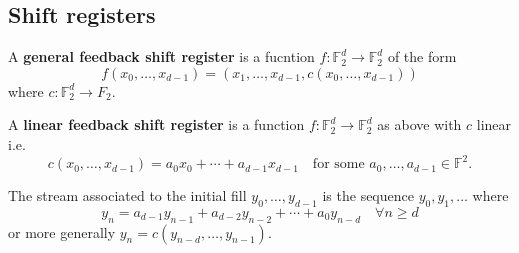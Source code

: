 \documentclass{article}
\newcommand{\F}{\mathbb{F}}
\newcommand{\1}[1]{\mathbbm{1}_{#1}}
\begin{document}
\subsection{Shift registers}
\begin{defi}
    A \textbf{general feedback shift register} is a fucntion $f:\F_2^d \to \F_2^d$ of the form
    \begin{equation*}
        f(x_0, \dotsc, x_{d-1}) = (x_1, \dotsc, x_{d-1}, c(x_0, \dotsc, x_{d-1}))
    \end{equation*}
    where $c:\F_2^d \to F_2$.
\end{defi}
\begin{defi}
    A \textbf{linear feedback shift register} is a function $f: \F_2^d \to \F_2^d$ as above with $c$ linear i.e.\
    \begin{equation*}
        c(x_0, \dotsc, x_{d-1}) = a_0 x_0 + \dotsb + a_{d-1} x_{d-1} \quad \text{for some } a_0, \dotsc, a_{d-1} \in \F^2.
    \end{equation*}
\end{defi}
The stream associated to the initial fill $y_0, \dotsc, y_{d-1}$ is the sequence $y_0, y_1, \dotsc$ where
\begin{equation*}
    y_n = a_{d-1} y_{n-1} + a_{d-2} y_{n-2} + \dotsb + a_0 y_{n-d} \quad \forall n \geq d
\end{equation*}
or more generally $y_n = c(y_{n-d}, \dotsc, y_{n-1})$.
\end{document}
